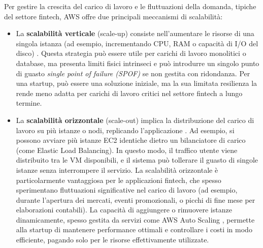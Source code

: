 Per gestire la crescita del carico di lavoro e le fluttuazioni della domanda, tipiche del settore fintech, AWS offre due principali meccanismi di scalabilità:
\begin{itemize}
    \item La \textbf{scalabilità verticale} (scale-up) consiste nell'aumentare le risorse di una singola istanza (ad esempio, incrementando CPU, RAM o capacità di I/O del disco) \cite{awsAutoScaling}. Questa strategia può essere utile per carichi di lavoro monolitici o database, ma presenta limiti fisici intrinseci e può introdurre un singolo punto di guasto \textit{single point of failure (SPOF)} se non gestita con ridondanza. Per una startup, può essere una soluzione iniziale, ma la sua limitata resilienza la rende meno adatta per carichi di lavoro critici nel settore fintech a lungo termine.
    \item La \textbf{scalabilità orizzontale} (scale-out) implica la distribuzione del carico di lavoro su più istanze o nodi, replicando l'applicazione \cite{awsAutoScaling}. Ad esempio, si possono avviare più istanze EC2 identiche dietro un bilanciatore di carico (come Elastic Load Balancing). In questo modo, il traffico utente viene distribuito tra le VM disponibili, e il sistema può tollerare il guasto di singole istanze senza interrompere il servizio. La scalabilità orizzontale è particolarmente vantaggiosa per le applicazioni fintech, che spesso sperimentano fluttuazioni significative nel carico di lavoro (ad esempio, durante l'apertura dei mercati, eventi promozionali, o picchi di fine mese per elaborazioni contabili). La capacità di aggiungere o rimuovere istanze dinamicamente, spesso gestita da servizi come AWS Auto Scaling \cite{awsAutoScaling}, permette alla startup di mantenere performance ottimali e controllare i costi in modo efficiente, pagando solo per le risorse effettivamente utilizzate.
\end{itemize}

